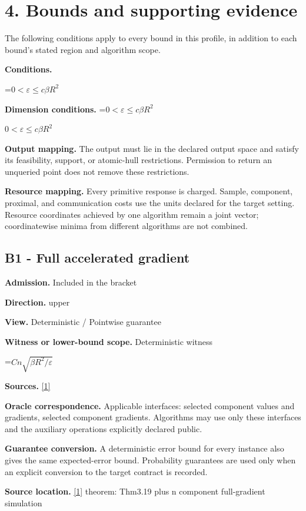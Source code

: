 \documentclass[10pt,a4paper]{article}
\newcommand{\AtlasMath}[1]{\par\begingroup\centering\setbox0=\hbox{$\displaystyle #1$}\ifdim\wd0>1.4\linewidth\typeout{ATLAS WIDE FORMULA: \the\wd0}\fi\ifdim\wd0>\linewidth\resizebox{\linewidth}{!}{\box0}\else\box0\fi\par\endgroup}
\newcommand{\AtlasInlineMath}[1]{\begingroup\setbox0=\hbox{$#1$}\ifdim\wd0>.4\linewidth\endgroup\AtlasMath{#1}\else\endgroup$#1$\fi}
\begin{document}
\section{4. Bounds and supporting evidence}
The following conditions apply to every bound in this profile, in addition to each bound's stated region and algorithm scope.

\textbf{Conditions.} 
\AtlasMath{0<\varepsilon\le c\beta R^2}


\textbf{Dimension conditions.} \AtlasInlineMath{0<\varepsilon\le c\beta R^2}

\textbf{Output mapping.} The output must lie in the declared output space and satisfy its feasibility, support, or atomic-hull restrictions. Permission to return an unqueried point does not remove these restrictions.

\textbf{Resource mapping.} Every primitive response is charged. Sample, component, proximal, and communication costs use the units declared for the target setting. Resource coordinates achieved by one algorithm remain a joint vector; coordinatewise minima from different algorithms are not combined.

\subsection{B1 - Full accelerated gradient}
\textbf{Admission.} Included in the bracket

\textbf{Direction.} upper

\textbf{View.} Deterministic / Pointwise guarantee

\textbf{Witness or lower-bound scope.} Deterministic witness

\AtlasMath{Cn\sqrt{\beta R^2/\varepsilon}}
\textbf{Sources.} \href{https://arxiv.org/pdf/1405.4980}{[1]}

\textbf{Oracle correspondence.} Applicable interfaces: selected component values and gradients, selected component gradients. Algorithms may use only these interfaces and the auxiliary operations explicitly declared public.

\textbf{Guarantee conversion.} A deterministic error bound for every instance also gives the same expected-error bound. Probability guarantees are used only when an explicit conversion to the target contract is recorded.

\textbf{Source location.} \href{https://arxiv.org/pdf/1405.4980}{[1]} theorem: Thm3.19 plus n component full-gradient simulation
\end{document}
